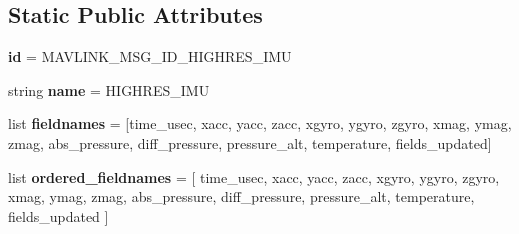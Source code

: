 \subsection*{Static Public Attributes}
\begin{DoxyCompactItemize}
\item 
\mbox{\label{classpymavlink_1_1dialects_1_1v10_1_1MAVLink__highres__imu__message_abceb03dc3070b884556f99d440123245}} 
{\bfseries id} = M\+A\+V\+L\+I\+N\+K\+\_\+\+M\+S\+G\+\_\+\+I\+D\+\_\+\+H\+I\+G\+H\+R\+E\+S\+\_\+\+I\+MU
\item 
\mbox{\label{classpymavlink_1_1dialects_1_1v10_1_1MAVLink__highres__imu__message_a9b10ec0a9c15ae5949e439849c8f555e}} 
string {\bfseries name} = \textquotesingle{}H\+I\+G\+H\+R\+E\+S\+\_\+\+I\+MU\textquotesingle{}
\item 
\mbox{\label{classpymavlink_1_1dialects_1_1v10_1_1MAVLink__highres__imu__message_a3ed8667d3c44d79e2ccac60277850c87}} 
list {\bfseries fieldnames} = \mbox{[}\textquotesingle{}time\+\_\+usec\textquotesingle{}, \textquotesingle{}xacc\textquotesingle{}, \textquotesingle{}yacc\textquotesingle{}, \textquotesingle{}zacc\textquotesingle{}, \textquotesingle{}xgyro\textquotesingle{}, \textquotesingle{}ygyro\textquotesingle{}, \textquotesingle{}zgyro\textquotesingle{}, \textquotesingle{}xmag\textquotesingle{}, \textquotesingle{}ymag\textquotesingle{}, \textquotesingle{}zmag\textquotesingle{}, \textquotesingle{}abs\+\_\+pressure\textquotesingle{}, \textquotesingle{}diff\+\_\+pressure\textquotesingle{}, \textquotesingle{}pressure\+\_\+alt\textquotesingle{}, \textquotesingle{}temperature\textquotesingle{}, \textquotesingle{}fields\+\_\+updated\textquotesingle{}\mbox{]}
\item 
\mbox{\label{classpymavlink_1_1dialects_1_1v10_1_1MAVLink__highres__imu__message_ad7f53cf0f704abe30022ef12b069203d}} 
list {\bfseries ordered\+\_\+fieldnames} = \mbox{[} \textquotesingle{}time\+\_\+usec\textquotesingle{}, \textquotesingle{}xacc\textquotesingle{}, \textquotesingle{}yacc\textquotesingle{}, \textquotesingle{}zacc\textquotesingle{}, \textquotesingle{}xgyro\textquotesingle{}, \textquotesingle{}ygyro\textquotesingle{}, \textquotesingle{}zgyro\textquotesingle{}, \textquotesingle{}xmag\textquotesingle{}, \textquotesingle{}ymag\textquotesingle{}, \textquotesingle{}zmag\textquotesingle{}, \textquotesingle{}abs\+\_\+pressure\textquotesingle{}, \textquotesingle{}diff\+\_\+pressure\textquotesingle{}, \textquotesingle{}pressure\+\_\+alt\textquotesingle{}, \textquotesingle{}temperature\textquotesingle{}, \textquotesingle{}fields\+\_\+updated\textquotesingle{} \mbox{]}

\end{DoxyCompactItemize}
